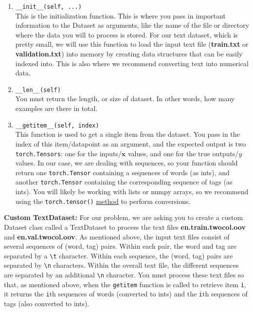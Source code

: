\documentclass[11pt,addpoints,answers]{exam}
\begin{document}
\begin{enumerate}
    \item \texttt{\_\_init\_\_(self, ...)} \\
    This is the initialization function. This is where you pass in important information to the Dataset as arguments, like the name of the file or directory where the data you will to process is stored. For our text dataset, which is pretty small, we will use this function to load the input text file (\textbf{train.txt} or \textbf{validation.txt}) into memory by creating data structures that can be easily indexed into. This is also where we recommend converting text into numerical data. 
    \item \texttt{\_\_len\_\_(self)} \\
    You must return the length, or size of dataset. In other words, how many examples are there in total.
    \item \texttt{\_\_getitem\_\_(self, index)} \\
    This function is used to get a single item from the dataset. You pass in the index of this item/datapoint as an argument, and the expected output is two \texttt{torch.Tensors}: one for the inputs/$\mathbf{x}$ values, and one for the true outputs/$y$ values. In our case, we are dealing with sequences, so your function should return one \texttt{torch.Tensor} containing a sequences of words (as ints), and another \texttt{torch.Tensor} containing the corresponding sequence of tags (as ints). You will likely be working with lists or numpy arrays, so we recommend using the \texttt{torch.tensor()} \href{https://pytorch.org/docs/stable/generated/torch.tensor.html}{method} to perform conversions.
\end{enumerate}

\textbf{Custom TextDataset:} For our problem, we are asking you to create a custom Dataset class called a TextDataset to process the text files \textbf{en.train.twocol.oov} and \textbf{en.val.twocol.oov}. As mentioned above, the input text files consist of several sequences of (word, tag) pairs. Within each pair, the word and tag are separated by a \texttt{\textbackslash t} character. Within each sequence, the (word, tag) pairs are separated by \texttt{\textbackslash n} characters. Within the overall text file, the different sequences are separated by an additional \texttt{\textbackslash n} character. You must process these text files so that, as mentioned above, when the \texttt{getitem} function is called to retrieve item \texttt{i}, it returns the \texttt{i}th sequences of words (converted to ints) and the \texttt{i}th sequences of tags (also converted to ints).
\end{document}
